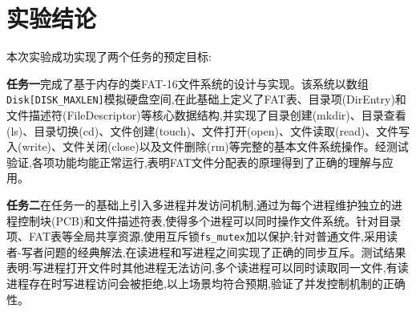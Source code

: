 \section{实验结论}
本次实验成功实现了两个任务的预定目标:

\textbf{任务一}完成了基于内存的类FAT-16文件系统的设计与实现。该系统以数组\texttt{Disk[DISK\_MAXLEN]}模拟硬盘空间,在此基础上定义了FAT表、目录项(DirEntry)和文件描述符(FileDescriptor)等核心数据结构,并实现了目录创建(mkdir)、目录查看(ls)、目录切换(cd)、文件创建(touch)、文件打开(open)、文件读取(read)、文件写入(write)、文件关闭(close)以及文件删除(rm)等完整的基本文件系统操作。经测试验证,各项功能均能正常运行,表明FAT文件分配表的原理得到了正确的理解与应用。

\textbf{任务二}在任务一的基础上引入多进程并发访问机制,通过为每个进程维护独立的进程控制块(PCB)和文件描述符表,使得多个进程可以同时操作文件系统。针对目录项、FAT表等全局共享资源,使用互斥锁\texttt{fs\_mutex}加以保护;针对普通文件,采用读者-写者问题的经典解法,在读进程和写进程之间实现了正确的同步互斥。测试结果表明:写进程打开文件时其他进程无法访问,多个读进程可以同时读取同一文件,有读进程存在时写进程访问会被拒绝,以上场景均符合预期,验证了并发控制机制的正确性。

